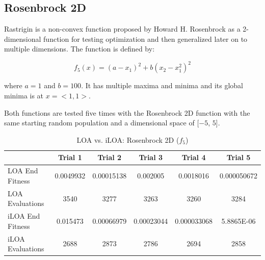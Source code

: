 \subsection{Rosenbrock 2D}

\par Rastrigin is a non-convex function proposed by Howard H. Rosenbrock as a 2-dimensional function for testing optimization and then generalized later on to multiple dimensions. The function is defined by:

$$
f_5(x) = (a-x_1)^2+b(x_2-x_1^2)^2
$$

where $a=1$ and $b=100$. It has multiple maxima and minima and its global minima is at $x=<1,1>$.

\par Both functions are tested five times with the Rosenbrock 2D function with the same starting random population and a dimensional space of [$-5$, $5$].

\begin{table}[ht]
\scriptsize
\begin{tabular}{l|ccccc}
\textbf{}        & \textbf{Trial 1} & \textbf{Trial 2} & \textbf{Trial 3} & \textbf{Trial 4} & \textbf{Trial 5} \\
\hline
LOA End Fitness  & 0.0049932        & 0.00015138       & 0.002005         & 0.0018016        & 0.000050672          \\
LOA Evaluations  & 3540             & 3277             & 3263             & 3260             & 3284             \\
iLOA End Fitness & 0.015473         & 0.00066979       & 0.00023044       & 0.000033068      & 5.8865E-06       \\
iLOA Evaluations & 2688             & 2873             & 2786             & 2694             & 2858
\end{tabular}
\caption{ \scriptsize LOA vs. iLOA: Rosenbrock 2D ($f_5$)}
\end{table}

